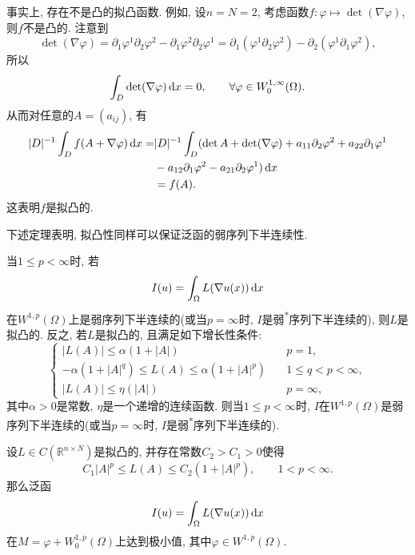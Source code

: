 \begin{example}
    事实上, 存在不是凸的拟凸函数. 例如, 设$n = N = 2$, 考虑函数$f\colon \varphi \mapsto \det(\nabla\varphi)$, 则$f$不是凸的.
    注意到 
    \begin{equation*}
        \det(\nabla\varphi) = \partial_1\varphi^1\partial_2\varphi^2 - \partial_1\varphi^2\partial_2\varphi^1 = \partial_1(\varphi^1\partial_2\varphi^2) - \partial_2(\varphi^1\partial_1\varphi^2), 
    \end{equation*}
    所以 
    \begin{equation*}
        \int_D\det(\nabla\varphi) \,{\rm d}x = 0, \qquad \forall \varphi \in W_0^{1, \infty}(\Omega).
    \end{equation*}
    从而对任意的$A = (a_{ij})$, 有 
    \begin{align*}
        |D|^{-1}\int_Df(A + \nabla\varphi) \,{\rm d}x = &|D|^{-1}\int_D(\det A + \det(\nabla\varphi) + a_{11}\partial_2\varphi^2 + a_{22}\partial_1\varphi^1 \\
        &- a_{12}\partial_1\varphi^2 - a_{21}\partial_2\varphi^1) \,{\rm d}x \\ 
        &= f(A).
    \end{align*}
    这表明$f$是拟凸的.
\end{example}

下述定理表明, 拟凸性同样可以保证泛函的弱序列下半连续性.

\begin{theorem}
    当$1 \leq p < \infty$时, 若 
    \begin{equation*}
        I(u) = \int_{\Omega}L(\nabla u(x)) \,{\rm d}x
    \end{equation*}
    在$W^{1, p}(\Omega)$上是弱序列下半连续的(或当$p = \infty$时, $I$是弱\textsuperscript{*}序列下半连续的), 则$L$是拟凸的.
    反之, 若$L$是拟凸的, 且满足如下增长性条件:
    \begin{equation*}
        \begin{cases}
            |L(A)| \leq \alpha(1 + |A|) \quad &p = 1, \\ 
            -\alpha(1 + |A|^q) \leq L(A) \leq \alpha(1 + |A|^p) \quad &1 \leq q < p < \infty, \\
            |L(A)| \leq \eta(|A|) \quad &p = \infty,
        \end{cases}
    \end{equation*}
    其中$\alpha > 0$是常数, $\eta$是一个递增的连续函数. 则当$1 \leq p < \infty$时, $I$在$W^{1, p}(\Omega)$是弱序列下半连续的(或当$p = \infty$时, $I$是弱\textsuperscript{*}序列下半连续的).
\end{theorem}

\begin{corollary}[存在性]
    设$L \in C(\mathbb{R}^{n \times N})$是拟凸的, 并存在常数$C_2 > C_1 > 0$使得 
    \begin{equation*}
        C_1|A|^p \leq L(A) \leq C_2(1 + |A|^p), \qquad 1 < p < \infty.
    \end{equation*}
    那么泛函 
    \begin{equation*}
        I(u) = \int_{\Omega}L(\nabla u(x)) \,{\rm d}x
    \end{equation*}
    在$M = \varphi + W_0^{1, p}(\Omega)$上达到极小值, 其中$\varphi \in W^{1, p}(\Omega)$.
\end{corollary}
